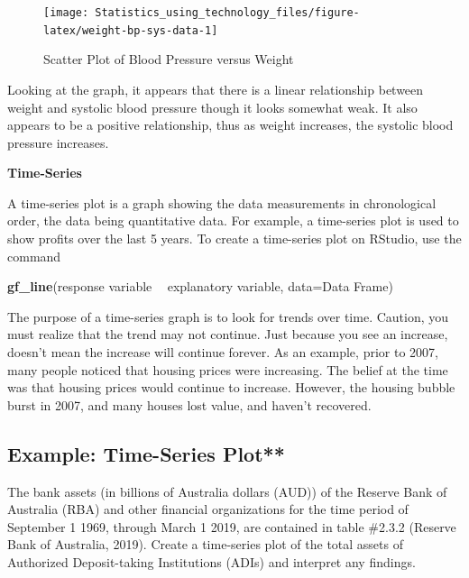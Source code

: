 \documentclass[
]{book}
\newenvironment{Shaded}{\begin{snugshade}}{\end{snugshade}}
\newcommand{\DataTypeTok}[1]{\textcolor[rgb]{0.13,0.29,0.53}{#1}}
\newcommand{\KeywordTok}[1]{\textcolor[rgb]{0.13,0.29,0.53}{\textbf{#1}}}
\newcommand{\NormalTok}[1]{#1}
\newcommand{\OperatorTok}[1]{\textcolor[rgb]{0.81,0.36,0.00}{\textbf{#1}}}
\newcommand{\StringTok}[1]{\textcolor[rgb]{0.31,0.60,0.02}{#1}}
\begin{document}
\begin{figure}
\texttt{[image: Statistics\_using\_technology\_files/figure-latex/weight-bp-sys-data-1]} \caption{Scatter Plot of Blood Pressure versus Weight}\label{fig:weight-bp-sys-data}
\end{figure}

Looking at the graph, it appears that there is a linear relationship between weight and systolic blood pressure though it looks somewhat weak. It also appears to be a positive relationship, thus as weight increases, the systolic blood pressure increases.

\textbf{Time-Series }

A time-series plot is a graph showing the data measurements in chronological order, the data being quantitative data. For example, a time-series plot is used to show profits over the last 5 years. To
create a time-series plot on RStudio, use the command

\begin{Shaded}
\begin{Highlighting}[]
\KeywordTok{gf_line}\NormalTok{(response variable }\OperatorTok{~}\StringTok{ }\NormalTok{explanatory variable, }\DataTypeTok{data=}\NormalTok{Data Frame)}
\end{Highlighting}
\end{Shaded}

The purpose of a time-series graph is to look for trends over time. Caution, you must realize that the trend may not continue. Just because you see an increase, doesn't mean the increase will continue forever. As an example, prior to 2007, many people noticed that housing prices were increasing. The belief at the time was that housing prices would continue to increase. However, the housing bubble burst in 2007, and many houses lost value, and haven't recovered.

\hypertarget{example-time-series-plot}{%
\subsection{Example: Time-Series Plot**}\label{example-time-series-plot}}

The bank assets (in billions of Australia dollars (AUD)) of the Reserve Bank of Australia (RBA) and other financial organizations for the time period of September 1 1969, through March 1 2019, are contained in table \#2.3.2 (Reserve Bank of Australia, 2019). Create a time-series plot of the total assets of Authorized Deposit-taking Institutions (ADIs) and interpret any findings.
\end{document}
